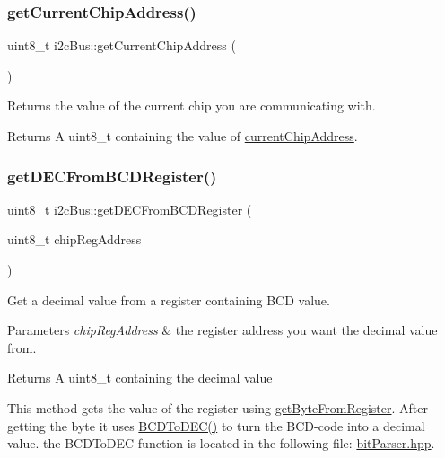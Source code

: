 \subsubsection{\texorpdfstring{get\+Current\+Chip\+Address()}{getCurrentChipAddress()}}
{\footnotesize\ttfamily uint8\+\_\+t i2c\+Bus\+::get\+Current\+Chip\+Address (\begin{DoxyParamCaption}{ }\end{DoxyParamCaption})}



Returns the value of the current chip you are communicating with. 

\begin{DoxyReturn}{Returns}
A uint8\+\_\+t containing the value of \mbox{\hyperlink{classi2c_bus_a64ff87527c88619d72ede947d73eac3a}{current\+Chip\+Address}}. 
\end{DoxyReturn}
\mbox{\label{classi2c_bus_a30d44d89d2f9b0d290cb2a207f6a4777}} 
\subsubsection{\texorpdfstring{get\+D\+E\+C\+From\+B\+C\+D\+Register()}{getDECFromBCDRegister()}}
{\footnotesize\ttfamily uint8\+\_\+t i2c\+Bus\+::get\+D\+E\+C\+From\+B\+C\+D\+Register (\begin{DoxyParamCaption}\item[{uint8\+\_\+t}]{chip\+Reg\+Address }\end{DoxyParamCaption})}



Get a decimal value from a register containing B\+CD value. 


\begin{DoxyParams}{Parameters}
{\em chip\+Reg\+Address} & the register address you want the decimal value from. \\
\hline
\end{DoxyParams}
\begin{DoxyReturn}{Returns}
A uint8\+\_\+t containing the decimal value
\end{DoxyReturn}
This method gets the value of the register using \mbox{\hyperlink{classi2c_bus_a7f83afc0264e758214db63cca336846d}{get\+Byte\+From\+Register}}. After getting the byte it uses \mbox{\hyperlink{group__bit_parser_gad207f006665a21b8cbdb0148d81b80c1}{B\+C\+D\+To\+D\+E\+C()}} to turn the B\+C\+D-\/code into a decimal value. the B\+C\+D\+To\+D\+EC function is located in the following file\+: \mbox{\hyperlink{bit_parser_8hpp_source}{bit\+Parser.\+hpp}}. \mbox{\label{classi2c_bus_a3b2f595372a05bde8e1cf9d6a86f2bdb}} 
